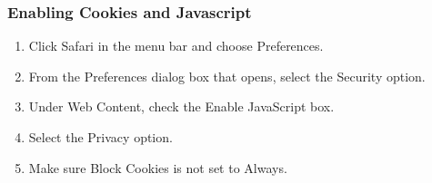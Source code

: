 \documentclass[hidelinks,english]{article}
\begin{document}
        \subsubsection{Enabling Cookies and Javascript}
            \begin{enumerate}
                \item Click Safari in the menu bar and choose Preferences.
                \item From the Preferences dialog box that opens, select the Security option.
                \item Under Web Content, check the Enable JavaScript box.
                \item Select the Privacy option.
                \item Make sure Block Cookies is not set to Always.
            \end{enumerate}
            \begin{center}
            \end{center}
\end{document}
